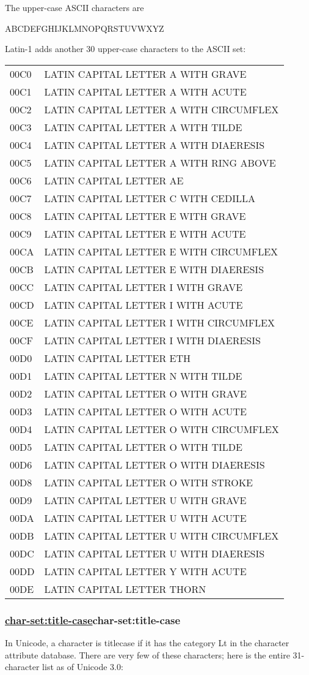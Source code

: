 The upper-case ASCII characters are

ABCDEFGHIJKLMNOPQRSTUVWXYZ

Latin-1 adds another 30 upper-case characters to the ASCII set:

\begin{tabular}{ll}
00C0 & LATIN CAPITAL LETTER A WITH GRAVE\tabularnewline
00C1 & LATIN CAPITAL LETTER A WITH ACUTE\tabularnewline
00C2 & LATIN CAPITAL LETTER A WITH CIRCUMFLEX\tabularnewline
00C3 & LATIN CAPITAL LETTER A WITH TILDE\tabularnewline
00C4 & LATIN CAPITAL LETTER A WITH DIAERESIS\tabularnewline
00C5 & LATIN CAPITAL LETTER A WITH RING ABOVE\tabularnewline
00C6 & LATIN CAPITAL LETTER AE\tabularnewline
00C7 & LATIN CAPITAL LETTER C WITH CEDILLA\tabularnewline
00C8 & LATIN CAPITAL LETTER E WITH GRAVE\tabularnewline
00C9 & LATIN CAPITAL LETTER E WITH ACUTE\tabularnewline
00CA & LATIN CAPITAL LETTER E WITH CIRCUMFLEX\tabularnewline
00CB & LATIN CAPITAL LETTER E WITH DIAERESIS\tabularnewline
00CC & LATIN CAPITAL LETTER I WITH GRAVE\tabularnewline
00CD & LATIN CAPITAL LETTER I WITH ACUTE\tabularnewline
00CE & LATIN CAPITAL LETTER I WITH CIRCUMFLEX\tabularnewline
00CF & LATIN CAPITAL LETTER I WITH DIAERESIS\tabularnewline
00D0 & LATIN CAPITAL LETTER ETH\tabularnewline
00D1 & LATIN CAPITAL LETTER N WITH TILDE\tabularnewline
00D2 & LATIN CAPITAL LETTER O WITH GRAVE\tabularnewline
00D3 & LATIN CAPITAL LETTER O WITH ACUTE\tabularnewline
00D4 & LATIN CAPITAL LETTER O WITH CIRCUMFLEX\tabularnewline
00D5 & LATIN CAPITAL LETTER O WITH TILDE\tabularnewline
00D6 & LATIN CAPITAL LETTER O WITH DIAERESIS\tabularnewline
00D8 & LATIN CAPITAL LETTER O WITH STROKE\tabularnewline
00D9 & LATIN CAPITAL LETTER U WITH GRAVE\tabularnewline
00DA & LATIN CAPITAL LETTER U WITH ACUTE\tabularnewline
00DB & LATIN CAPITAL LETTER U WITH CIRCUMFLEX\tabularnewline
00DC & LATIN CAPITAL LETTER U WITH DIAERESIS\tabularnewline
00DD & LATIN CAPITAL LETTER Y WITH ACUTE\tabularnewline
00DE & LATIN CAPITAL LETTER THORN\tabularnewline
\end{tabular}

\subsubsection{{\href{}{char-set:title-case}}{char-set:title-case}}\label{char-settitle-case}

In Unicode, a character is titlecase if it has the category Lt in the
character attribute database. There are very few of these characters;
here is the entire 31-character list as of Unicode 3.0:

